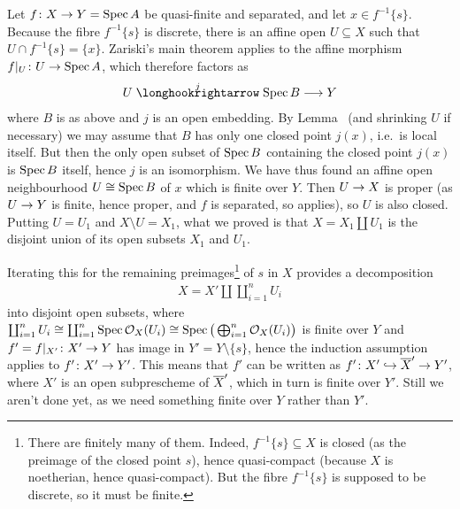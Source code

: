\documentclass[a4paper,parskip=half,numbers=enddot, DIV=12]{scrreprt}
\begin{document}
Let $f\colon X\morphism Y=\Spec A$ be quasi-finite and separated, and let $x\in f^{-1}\{s\}$. Because the fibre $f^{-1}\{s\}$ is discrete, there is an affine open $U\subseteq X$ such that $U\cap f^{-1}\{s\}=\{x\}$. Zariski's main theorem applies to the affine morphism $f|_U\colon U\morphism \Spec A$, which therefore factors as
\begin{align*}
	U\monomorphism[j]\Spec B\morphism Y
\end{align*}
where $B$ is as above and $j$ is an open embedding. By Lemma~ (and shrinking $U$ if necessary) we may assume that $B$ has only one closed point $j(x)$, i.e.\ is local itself. But then the only open subset of $\operatorname{Spec} B$ containing the closed point $j(x)$ is $\operatorname{Spec} B$ itself, hence $j$ is an isomorphism. We have thus found an affine open neighbourhood $U\cong \operatorname{Spec} B$ of $x$ which is finite over $Y$. Then $U\morphism X$ is proper (as $U\morphism Y$ is finite, hence proper, and $f$ is separated, so \cite[Proposition~2.4.1]{alggeo2} applies), so $U$ is also closed. Putting $U=U_1$ and $X\setminus U=X_1$, what we proved is that $X=X_1\amalg U_1$ is the disjoint union of its open subsets $X_1$ and $U_1$.

Iterating this for the remaining preimages\footnote{There are finitely many of them. Indeed, $f^{-1}\{s\}\subseteq X$ is closed (as the preimage of the closed point $s$), hence quasi-compact (because $X$ is noetherian, hence quasi-compact). But the fibre $f^{-1}\{s\}$ is supposed to be discrete, so it must be finite.} of $s$ in $X$ provides a decomposition 
\begin{align*}
	X=X'\amalg \coprod_{i=1}^nU_i
\end{align*}
into disjoint open subsets, where $\coprod_{i=1}^nU_i\cong \coprod_{i=1}^n\operatorname{Spec} \mathcal{O}_X(U_i)\cong \operatorname{Spec}\big(\bigoplus_{i=1}^n\mathcal{O}_X(U_i)\big)$ is finite over $Y$ and $f'=f|_{X'}\colon X'\morphism Y$ has image in $Y'=Y\setminus \{s\}$, hence the induction assumption applies to $f'\colon X'\morphism Y'$. This means that $f'$ can be written as $f'\colon X'\monomorphism \ov{X}'\morphism Y'$, where $X'$ is an open subprescheme of $\overline{X}'$, which in turn is finite over $Y'$. Still we aren't done yet, as we need something finite over $Y$ rather than $Y'$.
\end{document}
